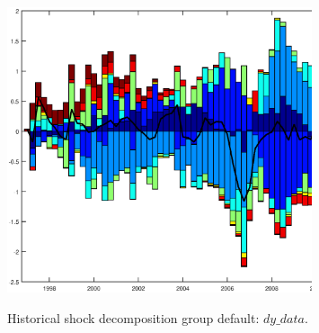  
\begin{figure}[H]
\centering 
\includegraphics[width=0.8\textwidth]{LTV1/graphs/LTV1_shock_decomposition_dy_data_group_default}
\label{Fig:shock_decomp:dy_data_group_default}
\caption{Historical shock decomposition group default: $ dy\_data $.}
\end{figure}
 
